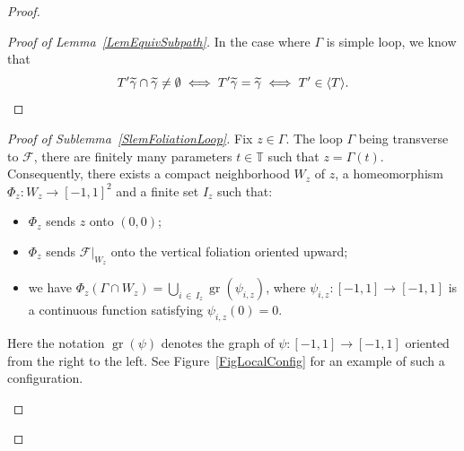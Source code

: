 \documentclass[10pt,a4paper]{article}
\theoremstyle{definition}
\theoremstyle{plain}
\numberwithin{equation}{section}
\numberwithin{figure}{section}
\DeclareMathOperator{\grr}{gr}
\newcommand{\T}{\mathbb{T}}
\newcommand{\F}{\mathcal{F}}
\let\oldtilde\tilde
\renewcommand*{\tilde}[1]{\mathchoice{\widetilde{#1}}{\widetilde{#1}}{\oldtilde{#1}}{\oldtilde{#1}}}
\begin{document}
\begin{proof}
\begin{proof}[Proof of Lemma~\ref{LemEquivSubpath}]
In the case where $\Gamma$ is simple loop, we know that
\[
T'\tilde\gamma\cap\tilde\gamma\ne\emptyset\iff T'\tilde\gamma=\tilde\gamma \iff T'\in\langle T\rangle.\qedhere
\]
\end{proof}


\begin{proof}[Proof of Sublemma~\ref{SlemFoliationLoop}]
Fix $z\in\Gamma$. The loop $\Gamma$ being transverse to $\F$, there are finitely many parameters $t\in\T$ such that $z=\Gamma(t)$. Consequently, there exists a compact neighborhood $W_z$ of $z$, a homeomorphism $\Phi_z: W_z\to[-1,1]^2$ and a finite set $I_z$ such that:
\begin{itemize}
\item $\Phi_z$ sends $z$ onto $(0,0)$;
\item $\Phi_z$ sends $\F|_{ W_z}$ onto the vertical foliation oriented upward;
\item we have $\Phi_z(\Gamma\cap W_z)= \bigcup_{i\,\in\,I_z}\grr(\psi_{i,z})$, where $\psi_{i,z}: [-1,1]\to[-1,1]$ is a continuous function satisfying $\psi_{i,z}(0)=0$.
\end{itemize}
Here the notation $\grr(\psi)$ denotes the graph of $\psi:[-1,1]\to [-1,1]$ oriented from the right to the left. See Figure~\ref{FigLocalConfig} for an example of such a configuration.

\begin{figure}
\begin{center}


\begin{tikzpicture}[x=0.75pt,y=0.75pt,yscale=-1.5,xscale=1.5]


\end{tikzpicture}
\end{center}
\end{figure}
\end{proof}
\end{proof}
\end{document}
